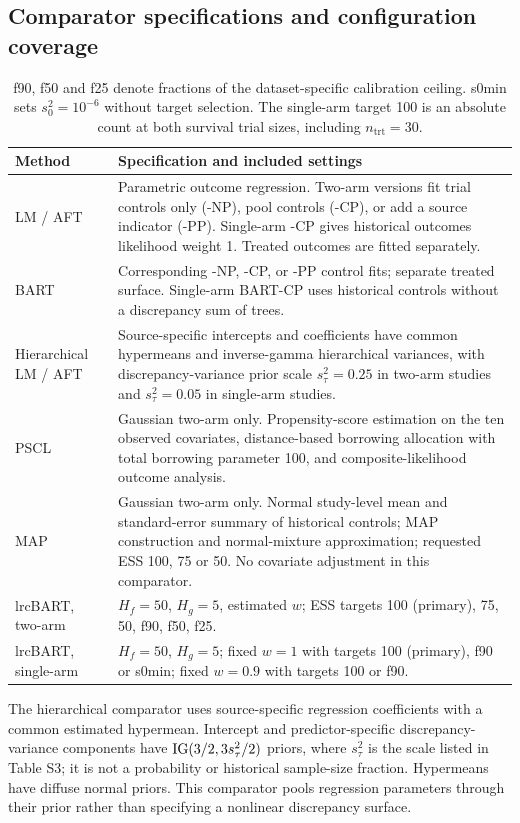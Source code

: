 \subsection{Comparator specifications and configuration coverage}\label{sec:E.4}
\begin{table}[htbp]
\centering\small
\caption{Methods and reporting configurations.}\label{tab:S3}
\begin{tabular}{p{1.2in}p{4.8in}}
\toprule
Method & Specification and included settings\\\midrule
LM / AFT & Parametric outcome regression. Two-arm versions fit trial controls only (-NP), pool controls (-CP), or add a source indicator (-PP). Single-arm -CP gives historical outcomes likelihood weight 1. Treated outcomes are fitted separately.\\
BART & Corresponding -NP, -CP, or -PP control fits; separate treated surface. Single-arm BART-CP uses historical controls without a discrepancy sum of trees.\\
Hierarchical LM / AFT & Source-specific intercepts and coefficients have common hypermeans and inverse-gamma hierarchical variances, with discrepancy-variance prior scale $s_\tau^2=0.25$ in two-arm studies and $s_\tau^2=0.05$ in single-arm studies.\\
PSCL & Gaussian two-arm only. Propensity-score estimation on the ten observed covariates, distance-based borrowing allocation with total borrowing parameter 100, and composite-likelihood outcome analysis.\\
MAP & Gaussian two-arm only. Normal study-level mean and standard-error summary of historical controls; MAP construction and normal-mixture approximation; requested ESS 100, 75 or 50. No covariate adjustment in this comparator.\\
lrcBART, two-arm & $H_f=50$, $H_g=5$, estimated $w$; ESS targets 100 (primary), 75, 50, f90, f50, f25.\\
lrcBART, single-arm & $H_f=50$, $H_g=5$; fixed $w=1$ with targets 100 (primary), f90 or s0min; fixed $w=0.9$ with targets 100 or f90.\\
\bottomrule
\end{tabular}
\caption*{f90, f50 and f25 denote fractions of the dataset-specific calibration ceiling. s0min sets $s_0^2=10^{-6}$ without target selection. The single-arm target 100 is an absolute count at both survival trial sizes, including $n_{\mathrm{trt}}=30$.}
\end{table}

The hierarchical comparator uses source-specific regression coefficients with a common estimated hypermean. Intercept and predictor-specific discrepancy-variance components have $\operatorname{IG}(3/2,3s_\tau^2/2)$ priors, where $s_\tau^2$ is the scale listed in Table S3; it is not a probability or historical sample-size fraction. Hypermeans have diffuse normal priors. This comparator pools regression parameters through their prior rather than specifying a nonlinear discrepancy surface.

